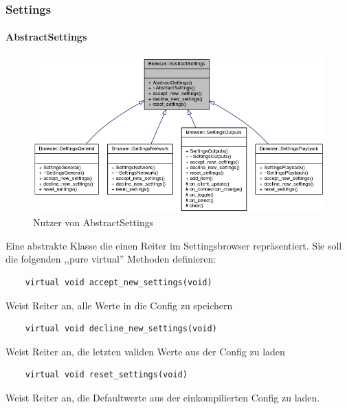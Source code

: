\newpage
\subsubsection{Settings}
\paragraph{AbstractSettings}
\begin{figure}[htb!]
	\centering
        \includegraphics[scale=0.5]{AbstractSettings.png}
	\caption{Nutzer von AbstractSettings}
	\label{class_abstract_browser}
\end{figure}
Eine abstrakte Klasse die einen Reiter im Settingsbrowser repräsentiert. 
Sie soll die folgenden ,,pure virtual'' Methoden definieren:

\begin{verbatim}
    virtual void accept_new_settings(void)
\end{verbatim}
Weist Reiter an, alle Werte in die Config zu speichern
     
\begin{verbatim}
    virtual void decline_new_settings(void)
\end{verbatim}     
Weist Reiter an, die letzten validen Werte aus der Config zu laden

\begin{verbatim}
    virtual void reset_settings(void)
\end{verbatim}
Weist Reiter an, die Defaultwerte aus der einkompilierten Config zu laden.

\newpage


